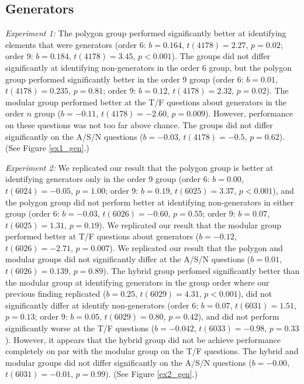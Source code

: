 \documentclass[man,mask,10pt]{apa6}
\begin{document}
\subsection{Generators}
\textit{Experiment 1:} The polygon group performed significantly better at identifying elements that were generators (order 6: $b = 0.164$, $t(4178) = 2.27$, $p = 0.02$; order 9: $b = 0.184$, $t(4178) = 3.45$, $p < 0.001$). The groups did not differ significantly at identifying non-generators in the order 6 group, but the polygon group performed significantly better in the order 9 group (order 6: $b = 0.01$, $t(4178) = 0.235$, $p = 0.81$; order 9: $b = 0.12$, $t(4178) = 2.32$, $p = 0.02$). The modular group performed better at the T/F questions about generators in the order $n$ group ($b = -0.11$, $t(4178) = -2.60$, $p = 0.009$). However, performance on these questions was not too far above chance. The groups did not differ significantly on the A/S/N questions ($b = -0.03$, $t(4178) = -0.5$, $p = 0.62$). (See Figure \ref{ex1_gen}.)\par
\textit{Experiment 2:} We replicated our result that the polygon group is better at identifying generators only in the order 9 group (order 6: $b = 0.00$, $t(6024) = -0.05$, $p = 1.00$; order 9: $b = 0.19$, $t(6025) = 3.37$, $p < 0.001$), and the polygon group did not perform better at identifying non-generators in either group (order 6: $b = -0.03$, $t(6026) = -0.60$, $p = 0.55$; order 9: $b = 0.07$, $t(6025) = 1.31$, $p = 0.19$). We replicated our result that the modular group performed better at T/F questions about generators ($b = -0.12$, $t(6026) = -2.71$, $p = 0.007$). We replicated our result that the polygon and modular groups did not significantly differ at the A/S/N questions ($b =  0.01$, $t(6026) = 0.139$, $p = 0.89$). The hybrid group perfomed significantly better than the modular group at identifying generators in the group order where our previous finding replicated ($b = 0.25$, $t(6029) = 4.31$, $p < 0.001$), did not significantly differ at identify non-generators (order 6: $b = 0.07$, $t(6031) = 1.51$, $p = 0.13$; order 9: $b = 0.05$, $t(6029) = 0.80$, $p = 0.42$), and did not perform significantly worse at the T/F questions ($b = -0.042$, $t(6033) = -0.98$, $p = 0.33$). However, it appears that the hybrid group did not be achieve performance completely on par with the modular group on the T/F questions. The hybrid and modular groups did not differ significantly on the A/S/N questions ($b = -0.00$, $t(6031) = -0.01$, $p = 0.99$). (See Figure \ref{ex2_gen}.) \par
\end{document}
